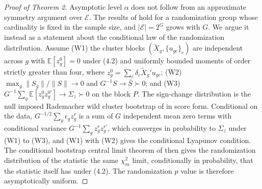 \documentclass[12pt]{article}
\theoremstyle{definition}
\numberwithin{equation}{section}
\begin{document}
\begin{proof}[Proof of Theorem 2]
Asymptotic level $\alpha$ does not follow from an approximate symmetry argument
over $\mathcal{E}$. The results of \citet{canay2017randomization} hold for a
randomization group whose cardinality is fixed in the sample size, and
$|\mathcal{E}| = 2^G$ grows with $G$. We argue it instead as a statement about
the conditional law of the randomization distribution. Assume (W1) the cluster
blocks $(\tilde{X}_g, \{u_{gc}\}_c)$ are independent across $g$ with
$\mathbb{E}[z^0_g] = 0$ under (4.2) and uniformly bounded moments of
order strictly greater than four, where $z^0_g = \sum_c \delta_c
\tilde{X}_g'u_{gc}$; (W2) $\max_g \|S_g\|/\|S\| \to 0$ and $G^{-1}S \to
\bar{S} \succ 0$; and (W3) $G^{-1}\sum_g \mathbb{E}[z^0_g z^{0\prime}_g] \to
\Sigma_z \succ 0$ on the block $P$. The sign-change distribution is the
null imposed Rademacher wild cluster bootstrap of \citet{cameron2008bootstrap}
in score form. Conditional on the data, $G^{-1/2}\sum_g \epsilon_g z^r_g$ is a
sum of $G$ independent mean zero terms with conditional variance $G^{-1}\sum_g
z^r_g z_g^{r\prime}$, which converges in probability to $\Sigma_z$ under (W1) to
(W3), and (W1) with (W2) gives the conditional Lyapunov condition. The
conditional bootstrap central limit theorem of \citet{djogbenou2019asymptotic}
then gives the randomization distribution of the statistic the same $\chi^2_m$
limit, conditionally in probability, that the statistic itself has under
(4.2). The randomization $p$ value is therefore asymptotically
uniform.
\end{proof}
\end{document}
